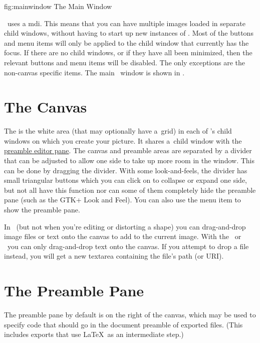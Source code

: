 \FloatFig
  {fig:mainwindow}
  {}
  {The Main Window}

\FlowframTk\ uses a \gls{mdi}. This means that you can have multiple
images loaded in separate child windows, without having to start up
new instances of \FlowframTk. Most of the buttons and menu items
will only be applied to the child window that currently has the
focus. If there are no child windows, or if they have all been
minimized, then the relevant buttons and menu items will be disabled.
The only exceptions are the non-\gls{canvas} specific items.
The main \FlowframTk\ window is shown in .


\section{The Canvas}\label{sec:thecanvas}

The  is the white area (that may optionally
have a~grid) in each of \FlowframTk's child windows on which you create
your picture. It shares a~child window with the
\hyperref[sec:thepreamblepane]{preamble editor pane}. The canvas and
preamble areas are separated by a divider that can be adjusted to
allow one side to take up more room in the window. This can be done
by dragging the divider.  With some \glspl{look-and-feel}, the
divider has small triangular buttons which you can click on to
collapse or expand one side, but not all have this function nor can
some of them completely hide the \gls{preamble} pane (such as the GTK+
Look and Feel).  You can also use the  menu
item to show the preamble pane.

In \selectmode\ (but not when you're editing or
distorting a shape) you can \gls{drag-and-drop} image files or
text onto the canvas to add to the current image. With the
\texttool\ or \mathstool\ you can only \gls{drag-and-drop} text onto
the canvas. If you attempt to drop a file instead, you will get a
new \gls{textarea} containing the file's path (or URI). 

\section{The Preamble Pane}\label{sec:thepreamblepane}

The preamble pane by default is on the right of the \gls{canvas},
which may be used to specify code that should go in the document
preamble of exported files. (This includes exports that use \LaTeX\
as an intermediate step.)

